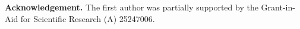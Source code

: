 \documentclass[reqno,12pt]{pja00} %
\newtheorem{theorem}{Theorem}[section]
\theoremstyle{definition}
\theoremstyle{exampstyle} \newtheorem{examp}[theorem]{Theorem}
\newcommand{\teven}{\mbox{\textrm{: even}}}
\newcommand{\todd}{\mbox{\textrm{: odd}}}
\begin{document}
	{\bf Acknowledgement.} The first author was partially supported by the Grant-in-Aid for Scientific Research (A) 25247006.
\end{document}
